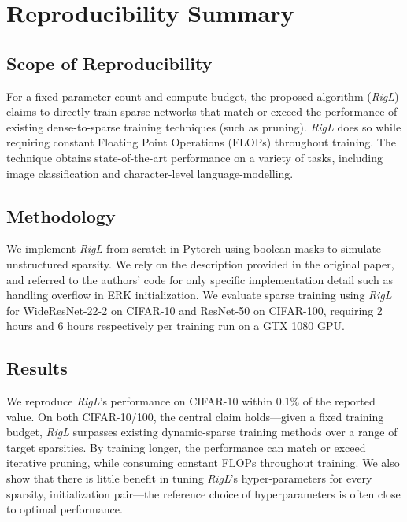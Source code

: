 \section*{\centering Reproducibility Summary}

\subsection*{Scope of Reproducibility}

For a fixed parameter count and compute budget, the proposed algorithm (\textit{RigL}) claims to directly train sparse networks that match or exceed the performance of existing dense-to-sparse training techniques (such as pruning). \textit{RigL} does so while requiring constant Floating Point Operations (FLOPs) throughout training. The technique obtains state-of-the-art performance on a variety of tasks, including image classification and character-level language-modelling.

\subsection*{Methodology}

We implement \textit{RigL} from scratch in Pytorch using boolean masks to simulate unstructured sparsity. We rely on the description provided in the original paper, and referred to the authors' code for only specific implementation detail such as handling overflow in ERK initialization. We evaluate sparse training using \textit{RigL} for WideResNet-22-2 on CIFAR-10 and ResNet-50 on CIFAR-100, requiring 2 hours and 6 hours respectively per training run on a GTX 1080 GPU.

\subsection*{Results}

We reproduce \textit{RigL}'s performance on CIFAR-10 within 0.1\% of the reported value. On both CIFAR-10/100, the central claim holds---given a fixed training budget, \textit{RigL} surpasses existing dynamic-sparse training methods over a range of target sparsities. By training longer, the performance can match or exceed iterative pruning, while consuming constant FLOPs throughout training. We also show that there is little benefit in tuning \textit{RigL}'s hyper-parameters for every sparsity, initialization pair---the reference choice of hyperparameters is often close to optimal performance. \\

